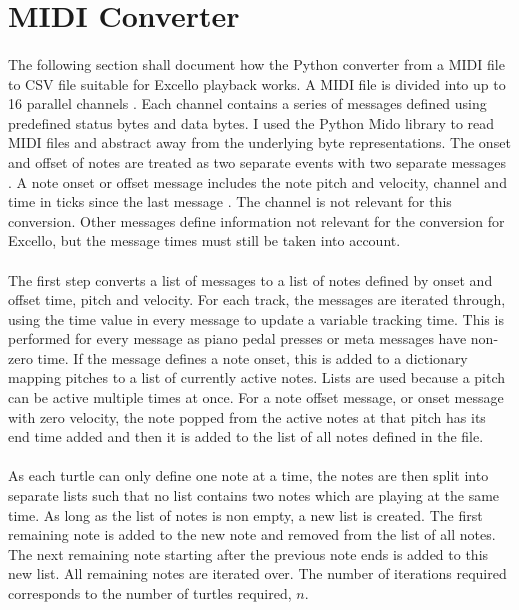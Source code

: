 \section{MIDI Converter}

\paragraph{} The following section shall document how the Python converter from a MIDI file to CSV file suitable for Excello playback works. A MIDI file is divided into up to 16 parallel channels \cite{midiSpec}. Each channel contains a series of messages defined using predefined status bytes and data bytes. I used the Python Mido library to read MIDI files and abstract away from the underlying byte representations. The onset and offset of notes are treated as two separate events with two separate messages \cite{midiSpec}. A note onset or offset message includes the note pitch and velocity, channel and time in ticks since the last message \cite{midoSpec}. The channel is not relevant for this conversion. Other messages define information not relevant for the conversion for Excello, but the message times must still be taken into account.

\paragraph{} The first step converts a list of messages to a list of notes defined by onset and offset time, pitch and velocity. For each track, the messages are iterated through, using the time value in every message to update a variable tracking time. This is performed for every message as piano pedal presses or meta messages have non-zero time. If the message defines a note onset, this is added to a dictionary mapping pitches to a list of currently active notes. Lists are used because a pitch can be active multiple times at once. For a note offset message, or onset message with zero velocity, the note popped from the active notes at that pitch has its end time added and then it is added to the list of all notes defined in the file.

\paragraph{} As each turtle can only define one note at a time, the notes are then split into separate lists such that no list contains two notes which are playing at the same time. As long as the list of notes is non empty, a new list is created. The first remaining note is added to the new note and removed from the list of all notes. The next remaining note starting after the previous note ends is added to this new list. All remaining notes are iterated over. The number of iterations required corresponds to the number of turtles required, $n$.

